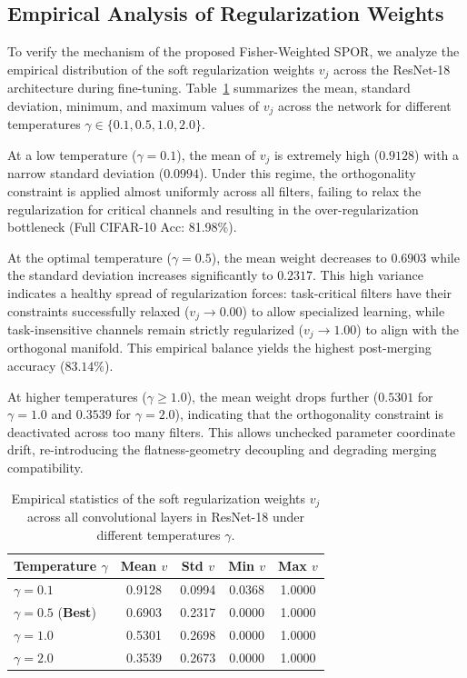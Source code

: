 \documentclass{article}
\theoremstyle{plain}
\theoremstyle{definition}
\theoremstyle{remark}
\begin{document}
\subsection{Empirical Analysis of Regularization Weights}
To verify the mechanism of the proposed Fisher-Weighted SPOR, we analyze the empirical distribution of the soft regularization weights $v_j$ across the ResNet-18 architecture during fine-tuning. Table~\ref{tab:v_stats} summarizes the mean, standard deviation, minimum, and maximum values of $v_j$ across the network for different temperatures $\gamma \in \{0.1, 0.5, 1.0, 2.0\}$.

At a low temperature ($\gamma = 0.1$), the mean of $v_j$ is extremely high ($0.9128$) with a narrow standard deviation ($0.0994$). Under this regime, the orthogonality constraint is applied almost uniformly across all filters, failing to relax the regularization for critical channels and resulting in the over-regularization bottleneck (Full CIFAR-10 Acc: 81.98\%).

At the optimal temperature ($\gamma = 0.5$), the mean weight decreases to $0.6903$ while the standard deviation increases significantly to $0.2317$. This high variance indicates a healthy spread of regularization forces: task-critical filters have their constraints successfully relaxed ($v_j \to 0.00$) to allow specialized learning, while task-insensitive channels remain strictly regularized ($v_j \to 1.00$) to align with the orthogonal manifold. This empirical balance yields the highest post-merging accuracy ($83.14\%$).

At higher temperatures ($\gamma \ge 1.0$), the mean weight drops further ($0.5301$ for $\gamma = 1.0$ and $0.3539$ for $\gamma = 2.0$), indicating that the orthogonality constraint is deactivated across too many filters. This allows unchecked parameter coordinate drift, re-introducing the flatness-geometry decoupling and degrading merging compatibility.

\begin{table}[t]
\caption{Empirical statistics of the soft regularization weights $v_j$ across all convolutional layers in ResNet-18 under different temperatures $\gamma$.}
\label{tab:v_stats}
\vskip 0.15in
\begin{center}
\begin{small}
\begin{sc}
\begin{tabular}{lcccc}
\toprule
Temperature $\gamma$ & Mean $v$ & Std $v$ & Min $v$ & Max $v$ \\
\midrule
$\gamma = 0.1$ & 0.9128 & 0.0994 & 0.0368 & 1.0000 \\
$\gamma = 0.5$ (\textbf{Best}) & 0.6903 & 0.2317 & 0.0000 & 1.0000 \\
$\gamma = 1.0$ & 0.5301 & 0.2698 & 0.0000 & 1.0000 \\
$\gamma = 2.0$ & 0.3539 & 0.2673 & 0.0000 & 1.0000 \\
\bottomrule
\end{tabular}
\end{sc}
\end{small}
\end{center}
\vskip -0.1in
\end{table}
\end{document}
